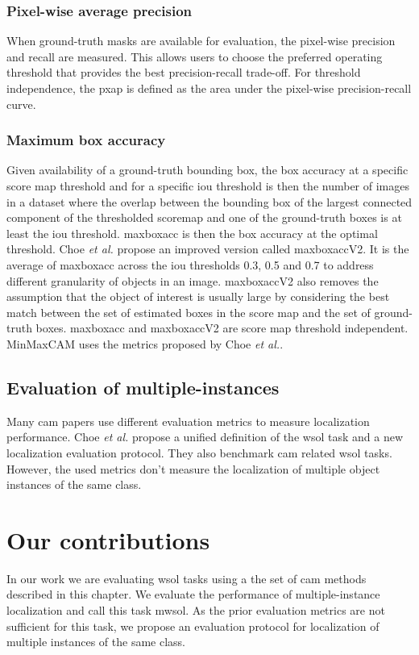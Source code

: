 \subsubsection{Pixel-wise average precision}
When ground-truth masks are available for evaluation, the pixel-wise precision and recall \cite{achanta2009frequency} are measured. This allows users to choose the preferred operating threshold that provides the best precision-recall trade-off. For threshold independence, the \acrfull{pxap} is defined as the area under the pixel-wise precision-recall curve.

\subsubsection{Maximum box accuracy}
Given availability of a ground-truth bounding box, the box accuracy at a specific score map threshold and for a specific \acrshort{iou} threshold is then the number of images in a dataset where the overlap  between the bounding box of the largest connected component of the thresholded scoremap and one of the ground-truth boxes is at least the \acrshort{iou} threshold. \acrshort{maxboxacc} is then the box accuracy at the optimal threshold. Choe \textit{et al.} propose an improved version called \acrshort{maxboxacc}V2. It is the average of \acrshort{maxboxacc} across the \acrshort{iou} thresholds 0.3, 0.5 and 0.7 to address different granularity of objects in an image. \acrshort{maxboxacc}V2 also removes the assumption that the object of interest is usually large by considering the best match between the set of estimated boxes in the score map and the set of ground-truth boxes. \acrshort{maxboxacc} and \acrshort{maxboxacc}V2 are score map threshold independent. MinMaxCAM \cite{wang2021minmaxcam} uses the metrics proposed by Choe \textit{et al.}.

\subsection{Evaluation of multiple-instances}
Many \acrshort{cam} papers use different evaluation metrics to measure localization performance. Choe \textit{et al.} \cite{choe2020evaluating} propose a unified definition of the \acrshort{wsol} task and a new localization evaluation protocol. They also benchmark \acrshort{cam} related \acrshort{wsol} tasks. However, the used metrics don't measure the localization of multiple object instances of the same class.

\section{Our contributions}
In our work we are evaluating \acrshort{wsol} tasks using a the set of \acrshort{cam} methods described in this chapter. We evaluate the performance of multiple-instance localization and call this task \acrfull{mwsol}. As the prior evaluation metrics are not sufficient for this task, we propose an evaluation protocol for localization of multiple instances of the same class. 


